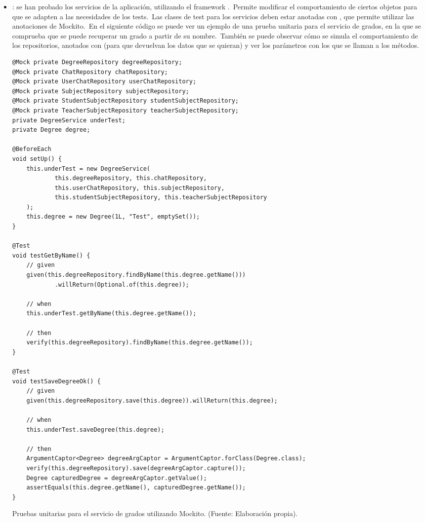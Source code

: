 \begin{itemize}
	\item {}: se han probado los servicios de la aplicación, utilizando el framework
	.\ Permite modificar el comportamiento de ciertos objetos para que se adapten a las necesidades
	de los tests.\ Las clases de test para los servicios deben estar anotadas con
	, que permite utilizar las anotaciones de Mockito.\ En el
	siguiente código se puede ver un ejemplo de una prueba unitaria para el servicio de grados, en la que se
	comprueba que se puede recuperar un grado a partir de su nombre.\ También se puede observar cómo se simula el
	comportamiento de los repositorios, anotados con  (para que devuelvan los datos que se quieran)
	y ver los parámetros con los que se llaman a los métodos.
	\begin{codeBlock}
		\begin{verbatim}
@Mock private DegreeRepository degreeRepository;
@Mock private ChatRepository chatRepository;
@Mock private UserChatRepository userChatRepository;
@Mock private SubjectRepository subjectRepository;
@Mock private StudentSubjectRepository studentSubjectRepository;
@Mock private TeacherSubjectRepository teacherSubjectRepository;
private DegreeService underTest;
private Degree degree;

@BeforeEach
void setUp() {
	this.underTest = new DegreeService(
			this.degreeRepository, this.chatRepository,
			this.userChatRepository, this.subjectRepository,
			this.studentSubjectRepository, this.teacherSubjectRepository
	);
	this.degree = new Degree(1L, "Test", emptySet());
}

@Test
void testGetByName() {
	// given
	given(this.degreeRepository.findByName(this.degree.getName()))
			.willReturn(Optional.of(this.degree));

	// when
	this.underTest.getByName(this.degree.getName());

	// then
	verify(this.degreeRepository).findByName(this.degree.getName());
}

@Test
void testSaveDegreeOk() {
	// given
	given(this.degreeRepository.save(this.degree)).willReturn(this.degree);

	// when
	this.underTest.saveDegree(this.degree);

	// then
	ArgumentCaptor<Degree> degreeArgCaptor = ArgumentCaptor.forClass(Degree.class);
	verify(this.degreeRepository).save(degreeArgCaptor.capture());
	Degree capturedDegree = degreeArgCaptor.getValue();
	assertEquals(this.degree.getName(), capturedDegree.getName());
}
		\end{verbatim}
		\caption{Pruebas unitarias para el servicio de grados utilizando Mockito. (Fuente: Elaboración propia).}
		\label{code:degreeServiceTest}
	\end{codeBlock}


\end{itemize}
